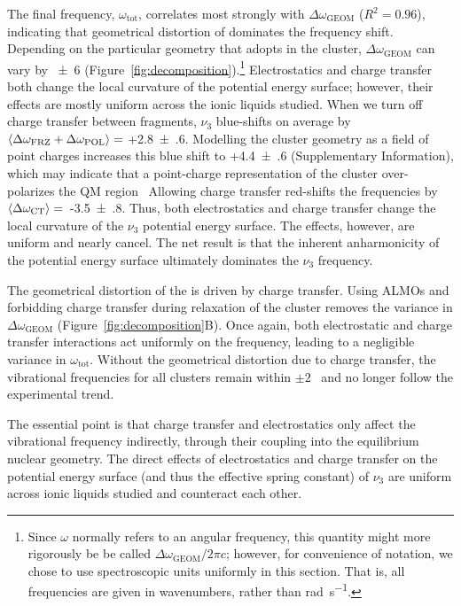 {The final frequency, \(\omega_\mathrm{tot}\), correlates most strongly with \(\Delta \omega_\mathrm{GEOM}\) (\(R^2 = 0.96\)), indicating that geometrical distortion of  dominates the frequency shift. Depending on the particular geometry that  adopts in the cluster, \(\Delta \omega_\mathrm{GEOM}\) can vary by \SI{\pm 6}{\wavenumber} (Figure~\ref{fig:decomposition}).\footnote{Since \(\omega\) normally refers to an angular frequency, this quantity might more rigorously be be called \(\Delta \omega_\mathrm{GEOM} / 2 \pi c\); however, for convenience of notation, we chose to use spectroscopic units uniformly in this section. That is, all frequencies are given in wavenumbers, rather than \si{\radian\per\second}.} Electrostatics and charge transfer both change the local curvature of the potential energy surface; however, their effects are mostly uniform across the ionic liquids studied. When we turn off charge transfer between fragments, \(\nu_3\) blue-shifts on average by \(\braket{\Delta \omega_\mathrm{FRZ} + \Delta \omega_\mathrm{POL}} =\) +\SI{2.8(6)}{\wavenumber}. Modelling the cluster geometry as a field of point charges increases this blue shift to +\SI{4.4(6)}{\wavenumber} (Supplementary Information), which may indicate that a point-charge representation of the cluster over-polarizes the QM region~\cite{Bakowies1996,Hu2011} Allowing charge transfer red-shifts the frequencies by $\braket{\Delta \omega_\mathrm{CT}} =$~-\SI{3.5(8)}{\wavenumber}.  Thus, both electrostatics and charge transfer change the local curvature of the \(\nu_3\) potential energy surface. The effects, however, are uniform and nearly cancel. The net result is that the inherent anharmonicity of the  potential energy surface ultimately dominates the \(\nu_3\) frequency.

The geometrical distortion of the  is driven by charge transfer. Using ALMOs and forbidding charge transfer during relaxation of the cluster removes the variance in \(\Delta \omega_\mathrm{GEOM}\) (Figure~\ref{fig:decomposition}B). Once again, both electrostatic and charge transfer interactions act uniformly on the frequency, leading to a negligible variance in \(\omega_\mathrm{tot}\). Without the geometrical distortion due to charge transfer, the vibrational frequencies for all clusters remain within $\pm2$~\si{\wavenumber} and no longer follow the experimental trend.

The essential point is that charge transfer and electrostatics only affect the vibrational frequency indirectly, through their coupling into the equilibrium  nuclear geometry. The direct effects of electrostatics and charge transfer on the potential energy surface (and thus the effective spring constant) of \(\nu_3\) are uniform across ionic liquids studied and counteract each other.

}
